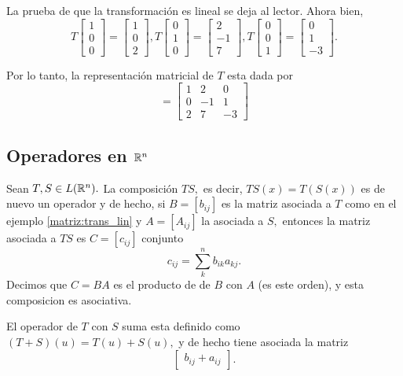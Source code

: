 \begin{solucion}
 La prueba de que la transformaci\'on es lineal se deja al lector. Ahora bien,
 $$
T\begin{bmatrix}
  1\\0\\0
 \end{bmatrix}
=\begin{bmatrix}
  1\\0\\2
 \end{bmatrix},
 T\begin{bmatrix}
  0\\1\\0
 \end{bmatrix}
=\begin{bmatrix}
  2\\-1\\7
 \end{bmatrix},
T\begin{bmatrix}
  0\\0\\1
 \end{bmatrix}
=\begin{bmatrix}
  0\\1\\-3
 \end{bmatrix}.
 $$

 Por lo tanto, la representaci\'on matricial de $T$ esta dada por
 $$
=\begin{bmatrix}
1 & 2 & 0 \\
0 & -1 & 1 \\
2 & 7 & -3
 \end{bmatrix}
 $$
\end{solucion}


\subsection*{Operadores en  $\mathbb{R}^{n}$}

Sean $T,S \in L(\mathbb{R}^{n}).$ La composici\'on $TS,$ es decir, $TS(x)=T(S(x))$ es de nuevo un operador y de hecho, si
$B=[b_{ij}]$ es la matriz asociada a $T$ como en el ejemplo \ref{matriz:trans_lin} y $A=[A_{ij}]$ la asociada a $S,$
entonces la matriz asociada a $TS$ es $C=[c_{ij}]$ conjunto $$
c_{ij}=\sum_{k}^{n}b_{ik}a_{kj}.
$$
Decimos que $C=BA$ es el producto de de $B$ con $A$ (es este orden), y esta composicion es asociativa.

El operador de $T$ con $S$ suma esta definido como $(T+S)(u)=T(u)+S(u),$ y de hecho tiene asociada la matriz $$
\begin{bmatrix}
 b_{ij}+a_{ij}
\end{bmatrix}.
$$

